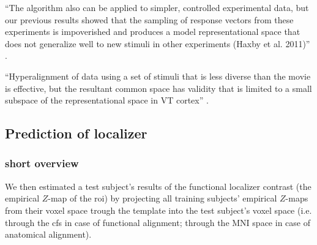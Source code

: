 %
``The algorithm also can be applied to simpler, controlled experimental data,
but our previous results showed that the sampling of response vectors from these
experiments is impoverished and produces a model representational space that
does not generalize well to new stimuli in other experiments (Haxby et al.
2011)'' \citep{guntupalli2016model}.

%
``Hyperalignment of data using a set of stimuli that is less diverse than the
movie is effective, but the resultant common space has validity that is limited
to a small subspace of the representational space in VT cortex''
\citep{haxby2011common}.



\subsection{Prediction of localizer}


\subsubsection{short overview}




%
We then estimated a test subject's results of the functional localizer contrast
(the empirical $Z$-map of the \ac{roi}) by projecting all training subjects'
empirical $Z$-maps from their voxel space trough the template into the test
subject's voxel space (i.e. through the \ac{cfs} in case of functional
alignment; through the MNI space in case of anatomical alignment).


